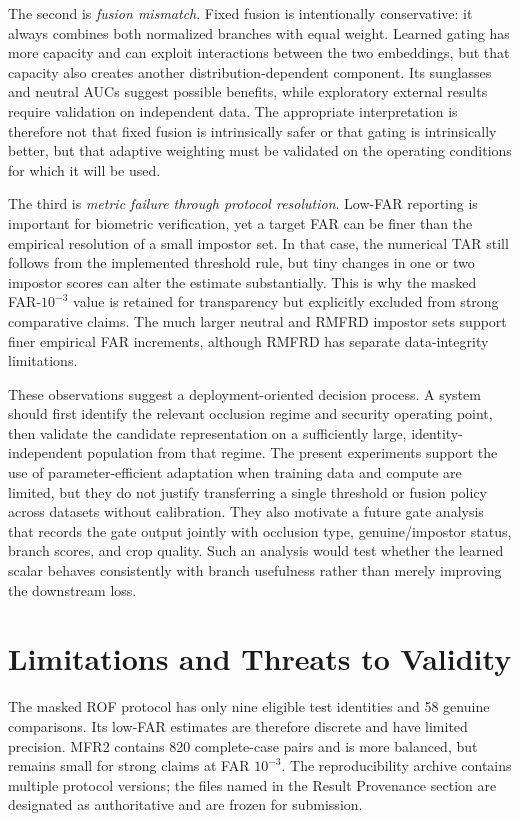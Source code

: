 \documentclass[10pt,journal,compsoc]{IEEEtran}
\begin{document}
The second is \emph{fusion mismatch}. Fixed fusion is intentionally conservative: it always combines both normalized branches with equal weight. Learned gating has more capacity and can exploit interactions between the two embeddings, but that capacity also creates another distribution-dependent component. Its sunglasses and neutral AUCs suggest possible benefits, while exploratory external results require validation on independent data. The appropriate interpretation is therefore not that fixed fusion is intrinsically safer or that gating is intrinsically better, but that adaptive weighting must be validated on the operating conditions for which it will be used.

The third is \emph{metric failure through protocol resolution}. Low-FAR reporting is important for biometric verification, yet a target FAR can be finer than the empirical resolution of a small impostor set. In that case, the numerical TAR still follows from the implemented threshold rule, but tiny changes in one or two impostor scores can alter the estimate substantially. This is why the masked FAR-$10^{-3}$ value is retained for transparency but explicitly excluded from strong comparative claims. The much larger neutral and RMFRD impostor sets support finer empirical FAR increments, although RMFRD has separate data-integrity limitations.

These observations suggest a deployment-oriented decision process. A system should first identify the relevant occlusion regime and security operating point, then validate the candidate representation on a sufficiently large, identity-independent population from that regime. The present experiments support the use of parameter-efficient adaptation when training data and compute are limited, but they do not justify transferring a single threshold or fusion policy across datasets without calibration. They also motivate a future gate analysis that records the gate output jointly with occlusion type, genuine/impostor status, branch scores, and crop quality. Such an analysis would test whether the learned scalar behaves consistently with branch usefulness rather than merely improving the downstream loss.

\section{Limitations and Threats to Validity}
The masked ROF protocol has only nine eligible test identities and 58 genuine comparisons. Its low-FAR estimates are therefore discrete and have limited precision. MFR2 contains 820 complete-case pairs and is more balanced, but remains small for strong claims at FAR $10^{-3}$. The reproducibility archive contains multiple protocol versions; the files named in the Result Provenance section are designated as authoritative and are frozen for submission.
\end{document}
